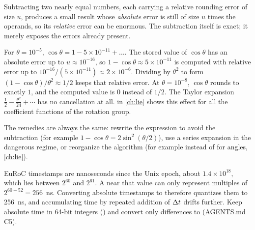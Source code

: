 Subtracting two nearly equal numbers, each carrying a relative rounding error of size $u$, produces a small result whose \emph{absolute}
error is still of size $u$ times the operands, so its \emph{relative} error can be enormous. The subtraction itself is exact; it merely
exposes the errors already present.

\begin{example}
\label{ex:cancellation}
For $\theta = 10^{-5}$, $\cos\theta = 1 - 5\times10^{-11} + \dots$. The stored value of $\cos\theta$ has an absolute error up to
$u \approx 10^{-16}$, so $1 - \cos\theta \approx 5\times 10^{-11}$ is computed with relative error up to $10^{-16}/(5\times10^{-11}) \approx 2\times
10^{-6}$. Dividing by $\theta^2$ to form $(1-\cos\theta)/\theta^2 \approx 1/2$ keeps that relative error. At $\theta = 10^{-8}$, $\cos\theta$ rounds
to exactly $1$, and the computed value is $0$ instead of $1/2$. The Taylor expansion $\tfrac12 - \tfrac{\theta^2}{24} + \cdots$ has no
cancellation at all.  in \cref{ch:lie} shows this effect for all the coefficient functions of the rotation group.
\end{example}

The remedies are always the same: rewrite the expression to avoid the subtraction (for example
$1 - \cos\theta = 2\sin^2(\theta/2)$), use a series expansion in the dangerous regime, or reorganize the algorithm (for example
 instead of  for angles, \cref{ch:lie}).

\begin{pitfall}
EuRoC timestamps are nanoseconds since the Unix epoch, about $1.4\times10^{18}$, which lies between $2^{60}$ and $2^{61}$. A  near
that value can only represent multiples of $2^{60-52} = 256$~ns. Converting absolute timestamps to  therefore quantizes them to
256~ns, and accumulating time by repeated addition of ${\Delta t}$ drifts further. Keep absolute time in 64-bit integers
() and convert only differences to  (AGENTS.md C5).
\end{pitfall}

